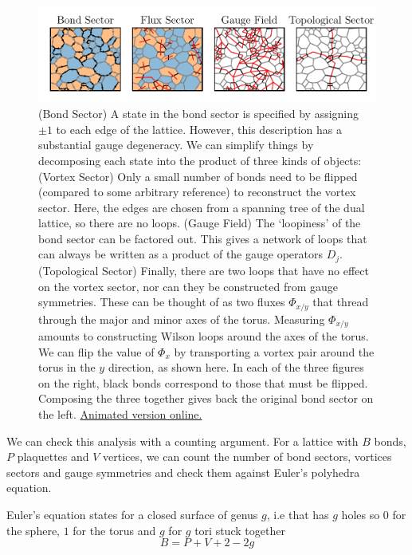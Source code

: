 \begin{figure}
\hypertarget{fig:state_decomposition_animated}{%
\centering
\includegraphics[width=1\textwidth,height=\textheight]{figure_code/amk_chapter/state_decomposition_animated/state_decomposition_animated.pdf}
\caption{(Bond Sector) A state in the bond sector is specified by assigning \(\pm 1\) to each edge of the lattice. However, this description has a substantial gauge degeneracy. We can simplify things by decomposing each state into the product of three kinds of objects: (Vortex Sector) Only a small number of bonds need to be flipped (compared to some arbitrary reference) to reconstruct the vortex sector. Here, the edges are chosen from a spanning tree of the dual lattice, so there are no loops. (Gauge Field) The `loopiness' of the bond sector can be factored out. This gives a network of loops that can always be written as a product of the gauge operators \(D_j\). (Topological Sector) Finally, there are two loops that have no effect on the vortex sector, nor can they be constructed from gauge symmetries. These can be thought of as two fluxes \(\Phi_{x/y}\) that thread through the major and minor axes of the torus. Measuring \(\Phi_{x/y}\) amounts to constructing Wilson loops around the axes of the torus. We can flip the value of \(\Phi_{x}\) by transporting a vortex pair around the torus in the \(y\) direction, as shown here. In each of the three figures on the right, black bonds correspond to those that must be flipped. Composing the three together gives back the original bond sector on the left. \href{http://thomashodson.com/assets/thesis/figure_code/amk_chapter/state_decomposition_animated/state_decomposition_animated.gif}{ Animated version online.}}\label{fig:state_decomposition_animated}
}
\end{figure}

We can check this analysis with a counting argument. For a lattice with \(B\) bonds, \(P\) plaquettes and \(V\) vertices, we can count the number of bond sectors, vortices sectors and gauge symmetries and check them against Euler's polyhedra equation.

Euler's equation states for a closed surface of genus \(g\), i.e that has \(g\) holes so \(0\) for the sphere, \(1\) for the torus and \(g\) for \(g\) tori stuck together \[B = P + V + 2 - 2g\]

